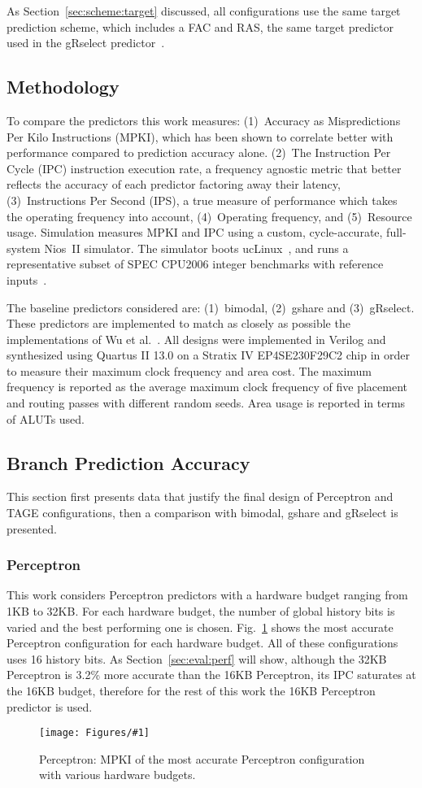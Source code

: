 \documentclass[conference]{IEEEtran}
\newcommand{\kfig}[4]{ %
        \begin{figure}[!t]
        \centering
        \texttt{[image: Figures/\#1]}
        \vspace{-1mm}
        \caption{#3}
        \label{#2}
        \end{figure}
}
\begin{document}
As Section~\ref{sec:scheme:target} discussed, all configurations use the same target prediction scheme, which includes a FAC and RAS, the same target predictor used in the gRselect predictor~\cite{grselect}.

\subsection{Methodology}
\label{sec:eval:methodology}
To compare the predictors this work measures: (1)~Accuracy as Mispredictions Per Kilo Instructions (MPKI), which has been shown to correlate better with performance compared to prediction accuracy alone. (2)~The Instruction Per Cycle (IPC) instruction execution rate, a frequency agnostic metric that better reflects the accuracy of each predictor factoring away their latency, (3)~Instructions Per Second (IPS), a true measure of performance which takes the operating frequency into account, (4)~Operating frequency, and (5)~Resource usage. Simulation measures MPKI and IPC using a custom, cycle-accurate, full-system Nios~II simulator. The simulator boots ucLinux~\cite{uclinux}, and runs a representative subset of SPEC CPU2006 integer benchmarks with reference inputs~\cite{spec2k6}.

The baseline predictors considered are: (1)~bimodal, (2)~gshare and (3)~gRselect. These predictors are implemented to match as closely as possible the implementations of Wu et al.~\cite{grselect}. All designs were implemented in Verilog and synthesized using Quartus II 13.0 on a Stratix IV EP4SE230F29C2 chip in order to measure their maximum clock frequency and area cost. The maximum frequency is reported as the average maximum clock frequency of five placement and routing passes with different random seeds. Area usage is reported in terms of ALUTs used.

\subsection{Branch Prediction Accuracy}
\label{sec:eval:accuracy}
This section first presents data that justify the final design of Perceptron and TAGE configurations, then a comparison with bimodal, gshare and gRselect is presented.

\subsubsection{Perceptron}
\label{sec:eval:accuracy:perceptron}
This work considers Perceptron predictors with a hardware budget ranging from 1KB to 32KB. For each hardware budget, the number of global history bits is varied and the best performing one is chosen. Fig.~\ref{fig:perceptronMPKI} shows the most accurate Perceptron configuration for each hardware budget. All of these configurations uses 16 history bits. As Section~\ref{sec:eval:perf} will show, although the 32KB Perceptron is 3.2\% more accurate than the 16KB Perceptron, its IPC saturates at the 16KB budget, therefore for the rest of this work the 16KB Perceptron predictor is used.
\kfig{perceptronMPKI.pdf}{fig:perceptronMPKI}{Perceptron: MPKI of the most accurate Perceptron configuration with various hardware budgets.}{angle = 0, trim = 0.9in 2.7in 0.8in 2.7in, clip, width=0.35\textwidth}
\end{document}
